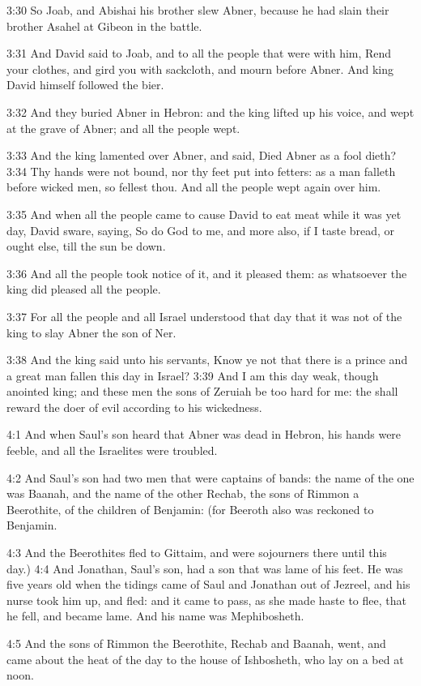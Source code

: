 3:30 So Joab, and Abishai his brother slew Abner, because he had slain their brother Asahel at Gibeon in the battle.

3:31 And David said to Joab, and to all the people that were with him, Rend your clothes, and gird you with sackcloth, and mourn before Abner. And king David himself followed the bier.

3:32 And they buried Abner in Hebron: and the king lifted up his voice, and wept at the grave of Abner; and all the people wept.

3:33 And the king lamented over Abner, and said, Died Abner as a fool dieth?  3:34 Thy hands were not bound, nor thy feet put into fetters: as a man falleth before wicked men, so fellest thou. And all the people wept again over him.

3:35 And when all the people came to cause David to eat meat while it was yet day, David sware, saying, So do God to me, and more also, if I taste bread, or ought else, till the sun be down.

3:36 And all the people took notice of it, and it pleased them: as whatsoever the king did pleased all the people.

3:37 For all the people and all Israel understood that day that it was not of the king to slay Abner the son of Ner.

3:38 And the king said unto his servants, Know ye not that there is a prince and a great man fallen this day in Israel?  3:39 And I am this day weak, though anointed king; and these men the sons of Zeruiah be too hard for me: the \LORD shall reward the doer of evil according to his wickedness.

4:1 And when Saul's son heard that Abner was dead in Hebron, his hands were feeble, and all the Israelites were troubled.

4:2 And Saul's son had two men that were captains of bands: the name of the one was Baanah, and the name of the other Rechab, the sons of Rimmon a Beerothite, of the children of Benjamin: (for Beeroth also was reckoned to Benjamin.

4:3 And the Beerothites fled to Gittaim, and were sojourners there until this day.)  4:4 And Jonathan, Saul's son, had a son that was lame of his feet. He was five years old when the tidings came of Saul and Jonathan out of Jezreel, and his nurse took him up, and fled: and it came to pass, as she made haste to flee, that he fell, and became lame. And his name was Mephibosheth.

4:5 And the sons of Rimmon the Beerothite, Rechab and Baanah, went, and came about the heat of the day to the house of Ishbosheth, who lay on a bed at noon.

